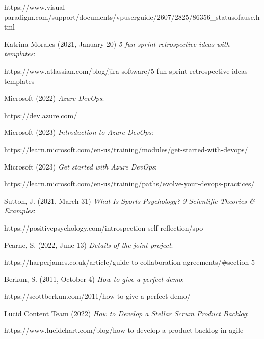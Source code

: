 \documentclass[10pt]{report}
\begin{document}
\begin{thebibliography}{1}
https://www.visual-paradigm.com/support/documents/vpuserguide/2607/2825/86356\_statusofause.html

Katrina Morales (2021, January 20) \emph{5 fun sprint retrospective ideas with templates}:

https://www.atlassian.com/blog/jira-software/5-fun-sprint-retrospective-ideas-templates

Microsoft (2022) \emph{Azure DevOps}:

https://dev.azure.com/

Microsoft (2023) \emph{Introduction to Azure DevOps}:

https://learn.microsoft.com/en-us/training/modules/get-started-with-devops/

Microsoft (2023) \emph{Get started with Azure DevOps}:

https://learn.microsoft.com/en-us/training/paths/evolve-your-devops-practices/

Sutton, J. (2021, March 31) \emph{What Is Sports Psychology? 9 Scientific Theories \& Examples}:

https://positivepsychology.com/introspection-self-reflection/spo

Pearne, S. (2022, June 13) \emph{Details of the joint project}:

https://harperjames.co.uk/article/guide-to-collaboration-agreements/\#section-5

Berkun, S. (2011, October 4) \emph{How to give a perfect demo}:

https://scottberkun.com/2011/how-to-give-a-perfect-demo/

Lucid Content Team (2022) \emph{How to Develop a Stellar Scrum Product Backlog}:

https://www.lucidchart.com/blog/how-to-develop-a-product-backlog-in-agile

\end{thebibliography}

\newpage
\end{document}
